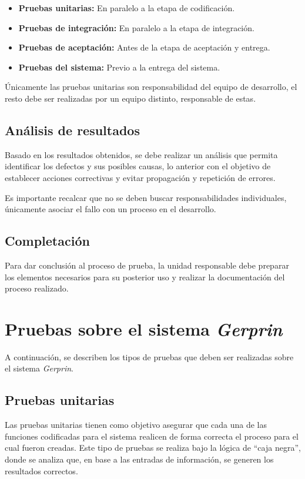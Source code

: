 \begin{itemize}
	\item
		\textbf{Pruebas unitarias:} En paralelo a la etapa de codificación.
	\item
		\textbf{Pruebas de integración:} En paralelo a la etapa de integración.
	\item
		\textbf{Pruebas de aceptación:} Antes de la etapa de aceptación y entrega.
	\item 
		\textbf{Pruebas del sistema:} Previo a la entrega del sistema.
\end{itemize}

Únicamente las pruebas unitarias son responsabilidad del equipo de desarrollo, el resto debe ser realizadas por un equipo distinto, responsable de estas.

\subsection{Análisis de resultados}

Basado en los resultados obtenidos, se debe realizar un análisis que permita identificar los defectos y sus posibles causas, lo anterior con el objetivo de establecer acciones correctivas y evitar propagación y repetición de errores.

Es importante recalcar que no se deben buscar responsabilidades individuales, únicamente asociar el fallo con un proceso en el desarrollo.

\subsection{Completación}

Para dar conclusión al proceso de prueba, la unidad responsable debe preparar los elementos necesarios para su posterior uso y realizar la documentación del proceso realizado.

\section{Pruebas sobre el sistema \emph{Gerprin}}

A continuación, se describen los tipos de pruebas que deben ser realizadas sobre el sistema \emph{Gerprin}. 

\subsection{Pruebas unitarias}

Las pruebas unitarias tienen como objetivo asegurar que cada una de las funciones codificadas para el sistema realicen de forma correcta el proceso para el cual fueron creadas. Este tipo de pruebas se realiza bajo la lógica de “caja negra”, donde se analiza que, en base a las entradas de información, se generen los resultados correctos.

